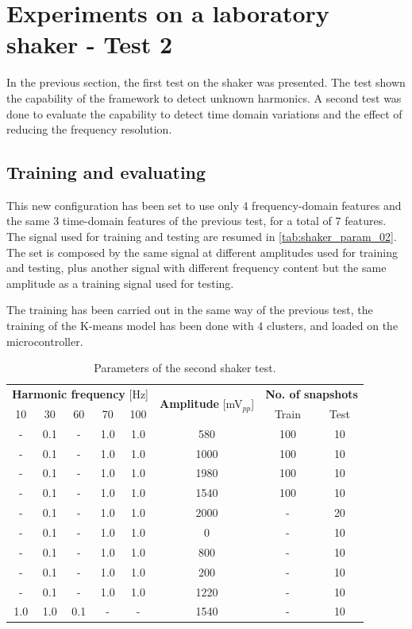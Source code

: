 \section{Experiments on a laboratory shaker - Test 2}
\label{sec:shaker_test02}
In the previous section, the first test on the shaker was presented. The test shown the capability of the framework to detect unknown harmonics. A second test was done to evaluate the capability to detect time domain variations and the effect of reducing the frequency resolution. 

\subsection{Training and evaluating}
This new configuration has been set to use only 4 frequency-domain features and the same 3 time-domain features of the previous test, for a total of 7 features. The signal used for training and testing are resumed in \autoref{tab:shaker_param_02}. The set is composed by the same signal at different amplitudes used for training and testing, plus another signal with different frequency content but the same amplitude as a training signal used for testing. 

The training has been carried out in the same way of the previous test, the training of the K-means model has been done with 4 clusters, and loaded on the microcontroller. 

\begin{table}
    \centering
    \caption{Parameters of the second shaker test.}
    \label{tab:shaker_param_02}
    \begin{tabular}{cccccccc} 
    \toprule
    \multicolumn{5}{c}{\textbf{Harmonic frequency} {[}Hz]} & \multirow{2}{*}{\textbf{Amplitude }{[}mV$_{pp}$]} & \multicolumn{2}{c}{\textbf{ No. of snapshots}} \\
    10 & 30 & 60 & 70 & 100 &  & Train & Test \\ 
    \hline
    - & 0.1 & - & 1.0 & 1.0 & 580 & 100 & 10 \\
    - & 0.1 & - & 1.0 & 1.0 & 1000 & 100 & 10 \\
    - & 0.1 & - & 1.0 & 1.0 & 1980 & 100 & 10 \\
    - & 0.1 & - & 1.0 & 1.0 & 1540 & 100 & 10 \\
    - & 0.1 & - & 1.0 & 1.0 & 2000 & - & 20 \\
    - & 0.1 & - & 1.0 & 1.0 & 0 & - & 10 \\
    - & 0.1 & - & 1.0 & 1.0 & 800 & - & 10 \\
    - & 0.1 & - & 1.0 & 1.0 & 200 & - & 10 \\
    - & 0.1 & - & 1.0 & 1.0 & 1220 & - & 10 \\
    1.0 & 1.0 & 0.1 & - & - & 1540 & - & 10 \\
    \bottomrule
    \end{tabular}
    \end{table}



